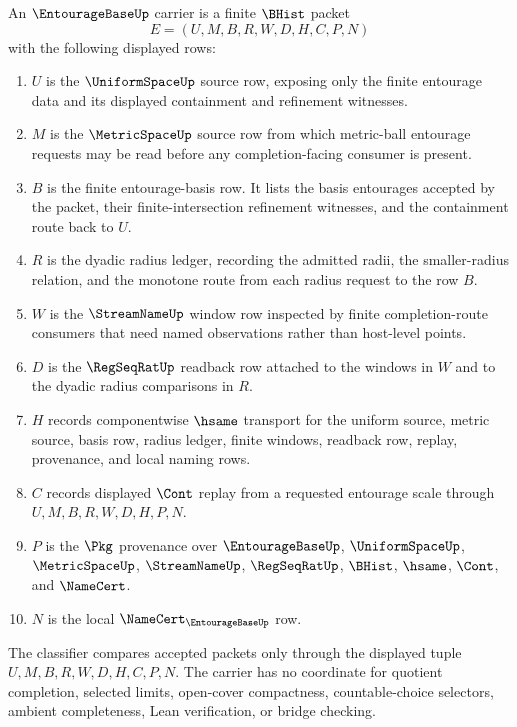 \begin{definition}
\label{def:entourage-base-carrier}
An $\EntourageBaseUp$ carrier is a finite $\BHist$ packet
$$
E=(U,M,B,R,W,D,H,C,P,N)
$$
with the following displayed rows:
\begin{enumerate}
\item $U$ is the $\UniformSpaceUp$ source row, exposing only the finite entourage data and its displayed containment and refinement witnesses.
\item $M$ is the $\MetricSpaceUp$ source row from which metric-ball entourage requests may be read before any completion-facing consumer is present.
\item $B$ is the finite entourage-basis row. It lists the basis entourages accepted by the packet, their finite-intersection refinement witnesses, and the containment route back to $U$.
\item $R$ is the dyadic radius ledger, recording the admitted radii, the smaller-radius relation, and the monotone route from each radius request to the row $B$.
\item $W$ is the $\StreamNameUp$ window row inspected by finite completion-route consumers that need named observations rather than host-level points.
\item $D$ is the $\RegSeqRatUp$ readback row attached to the windows in $W$ and to the dyadic radius comparisons in $R$.
\item $H$ records componentwise $\hsame$ transport for the uniform source, metric source, basis row, radius ledger, finite windows, readback row, replay, provenance, and local naming rows.
\item $C$ records displayed $\Cont$ replay from a requested entourage scale through $U,M,B,R,W,D,H,P,N$.
\item $P$ is the $\Pkg$ provenance over $\EntourageBaseUp$, $\UniformSpaceUp$, $\MetricSpaceUp$, $\StreamNameUp$, $\RegSeqRatUp$, $\BHist$, $\hsame$, $\Cont$, and $\NameCert$.
\item $N$ is the local $\NameCert_{\EntourageBaseUp}$ row.
\end{enumerate}
The classifier compares accepted packets only through the displayed tuple $U,M,B,R,W,D,H,C,P,N$. The carrier has no coordinate for quotient completion, selected limits, open-cover compactness, countable-choice selectors, ambient completeness, Lean verification, or bridge checking.
\end{definition}

